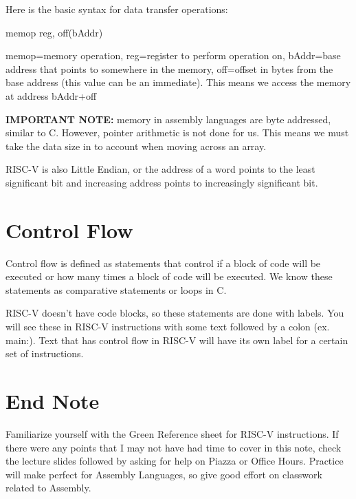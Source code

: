 \documentclass[letterpaper]{article}
\theoremstyle{remark}
\begin{document}
Here is the basic syntax for data transfer operations:

\begin{center}
    memop reg, off(bAddr)
\end{center}

memop=memory operation, reg=register to perform operation on, bAddr=base address that points to somewhere in the memory, off=offset in bytes from the base address (this value can be an immediate). This means we access the memory at address bAddr+off

\textbf{IMPORTANT NOTE:} memory in assembly languages are byte addressed, similar to C. However, pointer arithmetic is not done for us. This means we must take the data size in to account when moving across an array.

RISC-V is also Little Endian, or the address of a word points to the least significant bit and increasing address points to increasingly significant bit.

\section{Control Flow}
Control flow is defined as statements that control if a block of code will be executed or how many times a block of code will be executed. We know these statements as comparative statements or loops in C.

RISC-V doesn't have code blocks, so these statements are done with labels. You will see these in RISC-V instructions with some text followed by a colon (ex. main:). Text that has control flow in RISC-V will have its own label for a certain set of instructions.

\section{End Note}
Familiarize yourself with the Green Reference sheet for RISC-V instructions. If there were any points that I may not have had time to cover in this note, check the lecture slides followed by asking for help on Piazza or Office Hours. Practice will make perfect for Assembly Languages, so give good effort on classwork related to Assembly.
\end{document}
